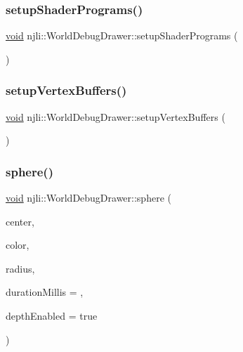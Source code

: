 \mbox{\label{classnjli_1_1_world_debug_drawer_a909649fb3b8e4eab5b8b76370b0e66d0}} 
\subsubsection{\texorpdfstring{setup\+Shader\+Programs()}{setupShaderPrograms()}}
{\footnotesize\ttfamily \mbox{\hyperlink{_thread_8h_af1e856da2e658414cb2456cb6f7ebc66}{void}} njli\+::\+World\+Debug\+Drawer\+::setup\+Shader\+Programs (\begin{DoxyParamCaption}{ }\end{DoxyParamCaption})\hspace{0.3cm}{\ttfamily [protected]}}

\mbox{\label{classnjli_1_1_world_debug_drawer_ad67f8074167c127eb49596c6d2d813a4}} 
\subsubsection{\texorpdfstring{setup\+Vertex\+Buffers()}{setupVertexBuffers()}}
{\footnotesize\ttfamily \mbox{\hyperlink{_thread_8h_af1e856da2e658414cb2456cb6f7ebc66}{void}} njli\+::\+World\+Debug\+Drawer\+::setup\+Vertex\+Buffers (\begin{DoxyParamCaption}{ }\end{DoxyParamCaption})\hspace{0.3cm}{\ttfamily [protected]}}

\mbox{\label{classnjli_1_1_world_debug_drawer_af5b08f142be7d2061437d20bfdfb12a4}} 
\subsubsection{\texorpdfstring{sphere()}{sphere()}}
{\footnotesize\ttfamily \mbox{\hyperlink{_thread_8h_af1e856da2e658414cb2456cb6f7ebc66}{void}} njli\+::\+World\+Debug\+Drawer\+::sphere (\begin{DoxyParamCaption}\item[{const bt\+Vector3 \&}]{center,  }\item[{const bt\+Vector3 \&}]{color,  }\item[{float}]{radius,  }\item[{int}]{duration\+Millis = {},  }\item[{bool}]{depth\+Enabled = {\ttfamily true} }\end{DoxyParamCaption})}

